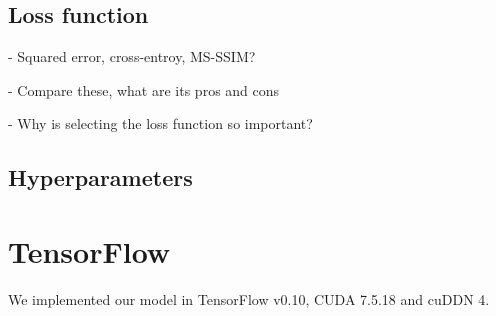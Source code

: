\subsection{Loss function}

- Squared error, cross-entroy, MS-SSIM?

- Compare these, what are its pros and cons

- Why is  selecting the loss function so important?

\subsection{Hyperparameters}

\section{TensorFlow}

We implemented our model in TensorFlow v0.10, CUDA 7.5.18 and cuDDN 4.




